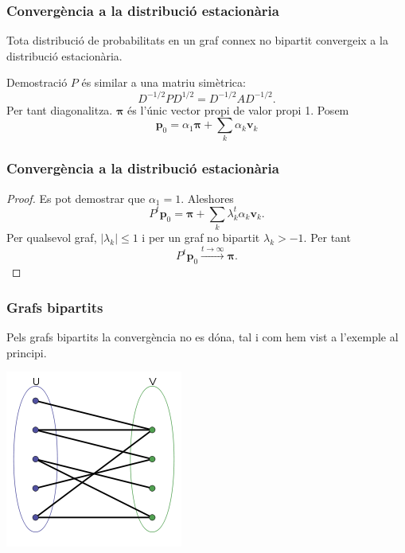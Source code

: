 \documentclass[aspectratio=169, 12pt]{beamer}
\renewcommand{\vec}[1]{\mathbf{\bm #1}}
\newcommand{\abs}[1]{\left\lvert #1 \right\rvert}
\begin{document}
\begin{frame}
	\frametitle{Convergència a la distribució estacionària}
	\begin{theorem}
		Tota distribució de probabilitats en un graf connex no bipartit convergeix a la distribució estacionària. 
	\end{theorem}
	\pause
	\begin{block}{Demostració}
\( P \) és similar a una matriu simètrica:
\[ D^{-1/2}PD^{1/2} = D^{-1/2}AD^{-1/2}. \] \pause
Per tant diagonalitza. \pause
\( \vec{\pi} \) és l'únic vector propi de valor propi 1. Posem \[ \vec{p}_0 = \alpha_1 \vec{\pi} + \sum_k \alpha_k \vec{v}_k \]
\end{block}
\end{frame}

\begin{frame}
	\frametitle{Convergència a la distribució estacionària}
	\begin{proof}
		Es pot demostrar que \( \alpha_1 = 1 \). \pause Aleshores
		\begin{equation*}
			P^t \vec{p}_0 = \vec{\pi} + \sum_k \lambda_k^t \alpha_k \vec{v}_k. 
		\end{equation*} \pause
		Per qualsevol graf, \( \abs{\lambda_k} \leq 1 \) i per un graf no bipartit \( \lambda_k > -1 \). \pause Per tant 
		\begin{equation*}
			P^t \vec{p}_0 \xrightarrow{t \to \infty} \vec{\pi}.
		\end{equation*}
	\end{proof}
\end{frame}

\begin{frame}
\frametitle{Grafs bipartits}
Pels grafs bipartits la convergència no es dóna, tal i com hem vist a l'exemple al principi. \pause

\centering
\includegraphics[scale = 0.7]{bipartit.png}
\end{frame}
\end{document}
